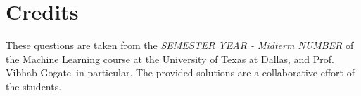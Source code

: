 \documentclass[12pt]{article}
\newcommand{\examtitle}{SEMESTER YEAR - Midterm NUMBER}
\newcommand{\examAuthor}{Prof. Vibhab Gogate}
\begin{document}
\section*{Credits}
These questions are taken from the \textit{\examtitle} of the Machine Learning course at the University of Texas at Dallas, and \examAuthor~in particular. The provided solutions are a collaborative effort of the students.
\end{document}
